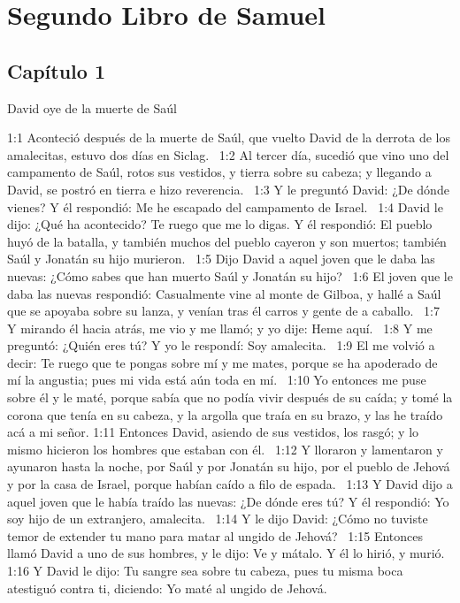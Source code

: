 \chapter{Segundo Libro de Samuel}

\section*{Capítulo 1}
David oye de la muerte de Saúl  


1:1 Aconteció después de la muerte de Saúl, que vuelto David de la derrota de los amalecitas, estuvo dos días en Siclag.  
1:2 Al tercer día, sucedió que vino uno del campamento de Saúl, rotos sus vestidos, y tierra sobre su cabeza; y llegando a David, se postró en tierra e hizo reverencia.  
1:3 Y le preguntó David: ¿De dónde vienes? Y él respondió: Me he escapado del campamento de Israel.  
1:4 David le dijo: ¿Qué ha acontecido? Te ruego que me lo digas. Y él respondió: El pueblo huyó de la batalla, y también muchos del pueblo cayeron y son muertos; también Saúl y Jonatán su hijo murieron.  
1:5 Dijo David a aquel joven que le daba las nuevas: ¿Cómo sabes que han muerto Saúl y Jonatán su hijo?  
1:6 El joven que le daba las nuevas respondió: Casualmente vine al monte de Gilboa, y hallé a Saúl que se apoyaba sobre su lanza, y venían tras él carros y gente de a caballo.  
1:7 Y mirando él hacia atrás, me vio y me llamó; y yo dije: Heme aquí.  
1:8 Y me preguntó: ¿Quién eres tú? Y yo le respondí: Soy amalecita.  
1:9 El me volvió a decir: Te ruego que te pongas sobre mí y me mates, porque se ha apoderado de mí la angustia; pues mi vida está aún toda en mí.  
1:10 Yo entonces me puse sobre él y le maté, porque sabía que no podía vivir después de su caída; y tomé la corona que tenía en su cabeza, y la argolla que traía en su brazo, y las he traído acá a mi señor. 
1:11 Entonces David, asiendo de sus vestidos, los rasgó; y lo mismo hicieron los hombres que estaban con él.  
1:12 Y lloraron y lamentaron y ayunaron hasta la noche, por Saúl y por Jonatán su hijo, por el pueblo de Jehová y por la casa de Israel, porque habían caído a filo de espada.  
1:13 Y David dijo a aquel joven que le había traído las nuevas: ¿De dónde eres tú? Y él respondió: Yo soy hijo de un extranjero, amalecita.  
1:14 Y le dijo David: ¿Cómo no tuviste temor de extender tu mano para matar al ungido de Jehová?  
1:15 Entonces llamó David a uno de sus hombres, y le dijo: Ve y mátalo. Y él lo hirió, y murió.  
1:16 Y David le dijo: Tu sangre sea sobre tu cabeza, pues tu misma boca atestiguó contra ti, diciendo: Yo maté al ungido de Jehová.  
